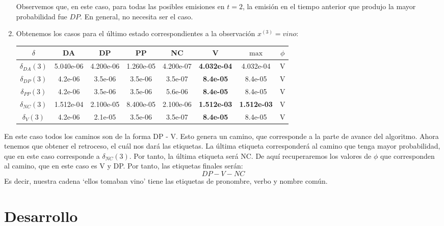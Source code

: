 \begin{enumerate}
     Observemos que, en este caso, para todas las posibles emisiones en $t=2$, la emisión en el tiempo anterior que produjo la mayor probabilidad fue $DP$.  En general, no necesita ser el caso.

     \item Obtenemos los casos para el último estado correspondientes a la observación $x^{(3)} = vino$:
        \begin{center}
        {\small
         \begin{tabular}{c c c c c c | c c} \hline
            $\delta$ & DA & DP & PP & NC & V & $\max$ & $\phi$\\ \hline
            $\delta_{DA}(3)$  & 5.040e-06 & 4.200e-06 & 1.260e-05 & 4.200e-07 & \textbf{4.032e-04} & 4.032e-04 & V \\
            $\delta_{DP}(3)$  & 4.2e-06 & 3.5e-06 & 3.5e-06 & 3.5e-07 & \textbf{8.4e-05} & 8.4e-05 & V \\
            $\delta_{PP}(3)$  & 4.2e-06 & 3.5e-06 & 3.5e-06 & 5.6e-06 & \textbf{8.4e-05} & 8.4e-05 & V \\
            $\delta_{NC}(3)$  & 1.512e-04 & 2.100e-05 & 8.400e-05 & 2.100e-06 & \textbf{1.512e-03} & \textbf{1.512e-03} & V \\
            $\delta_{V}(3)$  & 4.2e-06 & 2.1e-05 & 3.5e-06 & 3.5e-07 & \textbf{8.4e-05} & 8.4e-05 & V\\ \hline
         \end{tabular}}
     \end{center}
 \end{enumerate}

En este caso todos los caminos son de la forma DP - V. Esto genera un camino, que corresponde a la parte de avance del algoritmo. Ahora tenemos que obtener el retroceso, el cuál nos dará las etiquetas. La última etiqueta corresponderá al camino que tenga mayor probabilidad, que en este caso corresponde a $\delta_{NC}(3)$. Por tanto, la última etiqueta será NC. De aquí recuperaremos los valores de $\phi$ que corresponden al camino, que en este caso es V y DP. Por tanto, las etiquetas finales serán:
$$DP - V - NC$$
Es decir, nuestra cadena `ellos tomaban vino' tiene las etiquetas de pronombre, verbo y nombre común.






\section{Desarrollo}

